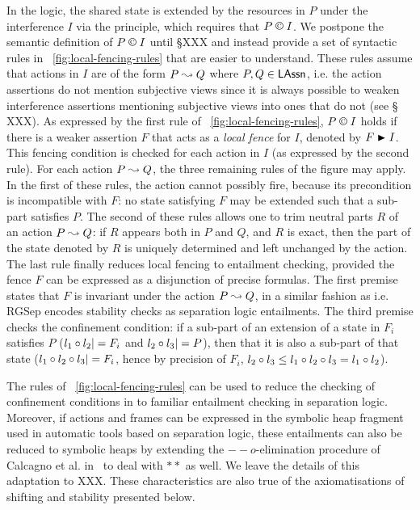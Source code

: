 In the logic, the shared state is extended by the resources in $P$ under
the interference $I$ via the \extendRule principle, which requires
that $P\containI I$. We postpone the semantic definition of $P \confines I$ until \S XXX and instead provide a set of syntactic rules in \fig~\ref{fig:local-fencing-rules} that are easier to understand.
These rules assume that actions in
$I$ are of the form $P \mathrel{\leadsto} Q$ where
$P,Q\in\mathsf{LAssn}$, i.e. the action assertions do not
mention subjective views since it is always possible to weaken
interference assertions mentioning subjective views into ones that do not (see \S
XXX). As expressed by the first rule of
\fig~\ref{fig:local-fencing-rules}, $P\containI I$ holds if there is a
weaker assertion $F$ that acts as a \emph{local fence} for $I$,
denoted by $F\strictfences I$. This fencing condition is checked for
each action in $I$ (as expressed by the second rule). For each action
$P\mathrel{\leadsto} Q$, the three remaining rules of the figure may apply. In the
first of these rules, the action cannot possibly fire, because its
precondition is incompatible with $F$: no state satisfying $F$ may be
extended such that a sub-part satisfies $P$. The second of these rules
allows one to trim neutral parts $R$ of an action $P\mathrel{\leadsto} Q$: if $R$
appears both in $P$ and $Q$, and $R$ is exact, then the part of the
state denoted by $R$ is uniquely determined and left unchanged by the
action. The last rule finally reduces local fencing to entailment
checking, provided the fence $F$ can be expressed as a disjunction of
precise formulas. The first premise states that $F$ is invariant under
the action $P\mathrel{\leadsto} Q$, in a similar fashion as i.e. RGSep
encodes stability checks as separation logic entailments. The third
premise checks the confinement condition: if a sub-part of an
extension of a state in $F_i$ satisfies $P$ ($l_1\circ l_2|= F_i$
and $l_2\circ l_3 |= P$), then that it is also a sub-part of that
state ($l_1\circ l_2\circ l_3|=F_i$, hence by precision of
$F_i$, $l_2\circ l_3\leq l_1\circ l_2\circ l_3 =
l_1\circ l_2$).

The rules of \fig~\ref{fig:local-fencing-rules} can be used to reduce
the checking of confinement conditions in \colosl to familiar
entailment checking in separation logic. Moreover, if actions and
frames can be expressed in the symbolic heap fragment used in
automatic tools based on separation logic, these entailments can also
be reduced to symbolic heaps by extending the $--o$-elimination
procedure of Calcagno et al. in~\cite{vv07msc} to deal with $**$ as
well. We leave the details of this adaptation to XXX. These
characteristics are also true of the axiomatisations of shifting and
stability presented below.

